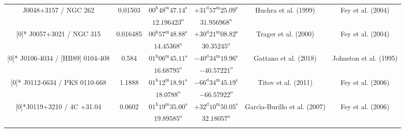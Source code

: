 \begin{landscape}
\begin{longtable}{cccccc}
    \multirow{2}[0]{*}{J0048+3157 / NGC 262} & \multirow{2}[0]{*}{0.01503} &   $00^\text{h}48^\text{m}47.14^\text{s}$ & $+31^\text{d}57^\text{m}25.09^\text{s}$ & \multirow{2}[0]{*}{Huchra et al. (1999) \cite{RedRef2_1999}} & \multirow{2}[0]{*}{Fey et al. (2004) \cite{CoordRef2_2004}} \\*
         & &  $12.196423^\text{o}$ &  $31.956968^\text{o} $ & & \\ \addlinespace 
    
    \multirow{2}[0]{*}{ J0057+3021 / NGC 315 } & \multirow{2}[0]{*}{ 0.016485 } &  
    $00^\text{h} 57^\text{m} 48.88^\text{s} $  & $+30^\text{d} 21^\text{m} 08.82^\text{s} $ & \multirow{2}[0]{*}{Trager et al. (2000) \cite{RedRef3_2000}} & \multirow{2}[0]{*}{Fey et al. (2004) \cite{CoordRef2_2004}} \\*
        & & $ 14.45368 ^\text{o}$ & $ 30.35245 ^\text{o}$ & & \\ \addlinespace
   
  
  \multirow{2}[0]{*}{ J0106-4034 / [HB89] 0104-408 } & \multirow{2}[0]{*}{ 0.584 } &  
    $01^\text{h} 06^\text{m}45.11^\text{s} $  & $-40^\text{d}34^\text{m} 19.96^\text{s} $  & 
    \multirow{2}[0]{*}{Gattano et al. (2018) \cite{RedRef5_2018}} & \multirow{2}[0]{*}{Johnston et al. (1995) \cite{CoordRef0_1995}} \\*
        & & $ 16.68795 ^\text{o}$ & $ -40.57221 ^\text{o}$ & & \\ \addlinespace
  
  \multirow{2}[0]{*}{ J0112-6634 / PKS 0110-668 } & \multirow{2}[0]{*}{ 1.1888 } &  
    $ 01^\text{h}12^\text{m}18.91^\text{s}$  & $ -66^\text{d}34^\text{m}45.19^\text{s}$  & 
    \multirow{2}[0]{*}{Titov et al. (2011) \cite{RedRef6_2011}} & \multirow{2}[0]{*}{Fey et al. (2006) \cite{CoordRef6_2006}} \\*
        & & $ 18.0788 ^\text{o}$ & $ -66.57922 ^\text{o}$ & & \\ \addlinespace
  
        
  \multirow{2}[0]{*}{J0119+3210 / 4C +31.04} & \multirow{2}[0]{*}{ 0.0602 } &  
    $01^\text{h}19^\text{m}35.00^\text{s} $  & $ +32^\text{d}10^\text{m}50.05^\text{s} $  & 
    \multirow{2}[0]{*}{Garc{\'\i}a-Burillo et al. (2007) \cite{RedRef8_2007}} & \multirow{2}[0]{*}{Fey et al. (2006) \cite{CoordRef6_2006}} \\*
        & & $ 19.89585 ^\text{o}$ & $ 32.18057 ^\text{o}$ & & \\ \addlinespace 
  

\end{longtable}
\end{landscape}
